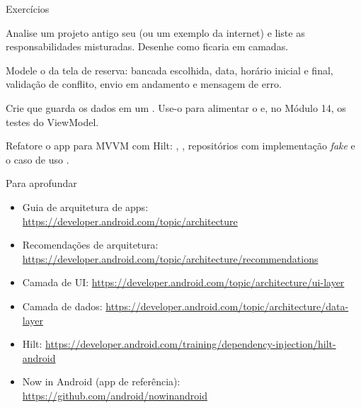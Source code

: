 \documentclass[aspectratio=169,10pt]{beamer}
\begin{document}
\begin{frame}{Exercícios}
  \begin{exercicio}
    Analise um projeto antigo seu (ou um exemplo da internet) e liste as responsabilidades misturadas. Desenhe como ficaria em camadas.
  \end{exercicio}
  \begin{exercicio}
    Modele o  da tela de reserva: bancada escolhida, data, horário inicial e final, validação de conflito, envio em andamento e mensagem de erro.
  \end{exercicio}
  \begin{exercicio}
    Crie  que guarda os dados em um . Use-o para alimentar o  e, no Módulo 14, os testes do ViewModel.
  \end{exercicio}
  \begin{projeto}
    Refatore o app para MVVM com Hilt: , , repositórios com implementação \emph{fake} e o caso de uso .
  \end{projeto}
\end{frame}

\begin{frame}{Para aprofundar}
  \small
  \begin{itemize}
    \item Guia de arquitetura de apps: \url{https://developer.android.com/topic/architecture}
    \item Recomendações de arquitetura: \url{https://developer.android.com/topic/architecture/recommendations}
    \item Camada de UI: \url{https://developer.android.com/topic/architecture/ui-layer}
    \item Camada de dados: \url{https://developer.android.com/topic/architecture/data-layer}
    \item Hilt: \url{https://developer.android.com/training/dependency-injection/hilt-android}
    \item Now in Android (app de referência): \url{https://github.com/android/nowinandroid}
  \end{itemize}
\end{frame}
\end{document}
